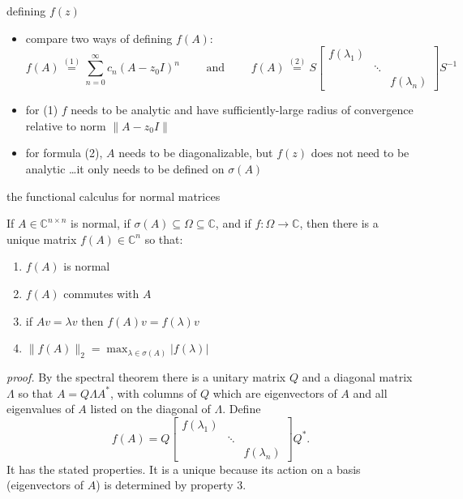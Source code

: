 \documentclass[10pt,hyperref]{beamer}
\newcommand{\CC}{\mathbb{C}}
\begin{document}
\begin{frame}{defining $f(z)$}

\begin{itemize}
\item compare two ways of defining $f(A)$:
\small
   $$f(A) \stackrel{(1)}{=} \sum_{n=0}^\infty c_n (A-z_0 I)^n \qquad \text{ and } \qquad f(A) \stackrel{(2)}{=} S \begin{bmatrix} f(\lambda_1) & & \\ & \ddots & \\ & & f(\lambda_n) \end{bmatrix} S^{-1}$$
\normalsize
\item for (1) $f$ needs to be analytic and have sufficiently-large radius of convergence relative to norm $\|A-z_0I\|$
\item for formula (2), $A$ needs to be diagonalizable, but $f(z)$ does not need to be analytic \dots it only needs to be defined on $\sigma(A)$
\end{itemize}
\end{frame}


\begin{frame}{the functional calculus for normal matrices}

\begin{theorem}
If $A\in \CC^{n\times n}$ is normal, if $\sigma(A) \subseteq \Omega \subseteq \CC$, and if $f:\Omega \to \CC$, then there is a unique matrix $f(A)\in\CC^n$ so that:
\begin{enumerate}
\item $f(A)$ is normal
\item $f(A)$ commutes with $A$
\item if $Av=\lambda v$ then $f(A)v=f(\lambda)v$
\item $\|f(A)\|_2 = \max_{\lambda\in\sigma(A)} |f(\lambda)|$
\end{enumerate}
\end{theorem}

\emph{proof.}  By the spectral theorem there is a unitary matrix $Q$ and a diagonal matrix $\Lambda$ so that $A=Q\Lambda A^*$, with columns of $Q$ which are eigenvectors of $A$ and all eigenvalues of $A$ listed on the diagonal of $\Lambda$.  Define
    $$f(A) = Q \begin{bmatrix} f(\lambda_1) & & \\ & \ddots & \\ & & f(\lambda_n) \end{bmatrix} Q^*.$$
It has the stated properties.  It is a unique because its action on a basis (eigenvectors of $A$) is determined by property 3.
\end{frame}
\end{document}
